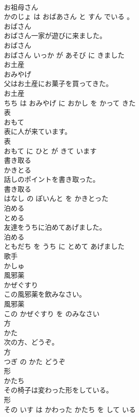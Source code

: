 \documentclass[8pt]{extreport}
\begin{document}
\begin{CJK}{UTF8}{min}
\\	お祖母さん 
\\	かのじょ は おばあさん と すん でいる 。			
\\	おばさん	
\\	おばさん一家が遊びに来ました。	
\\	おばさん 
\\	おばさん いっか が あそび に きました			
\\	お土産	
\\	おみやげ			
\\	父はお土産にお菓子を買ってきた。	
\\	お土産 
\\	ちち は おみやげ に おかし を かって きた			
\\	表	
\\	おもて			
\\	表に人が来ています。	
\\	表 
\\	おもて に ひと が きて います			
\\	書き取る	
\\	かきとる			
\\	話しのポイントを書き取った。	
\\	書き取る 
\\	はなし の ぽいんと を かきとった			
\\	泊める	
\\	とめる			
\\	友達をうちに泊めてあげました。	
\\	泊める 
\\	ともだち を うち に とめて あげました			
\\	歌手	
\\	かしゅ			
\\	風邪薬	
\\	かぜぐすり			
\\	この風邪薬を飲みなさい。	
\\	風邪薬 
\\	この かぜぐすり を のみなさい			
\\	方	
\\	かた			
\\	次の方、どうぞ。	
\\	方 
\\	つぎ の かた どうぞ			
\\	形	
\\	かたち			
\\	その椅子は変わった形をしている。	
\\	形 
\\	その いす は かわった かたち を して いる			

\end{CJK}
\end{document}
